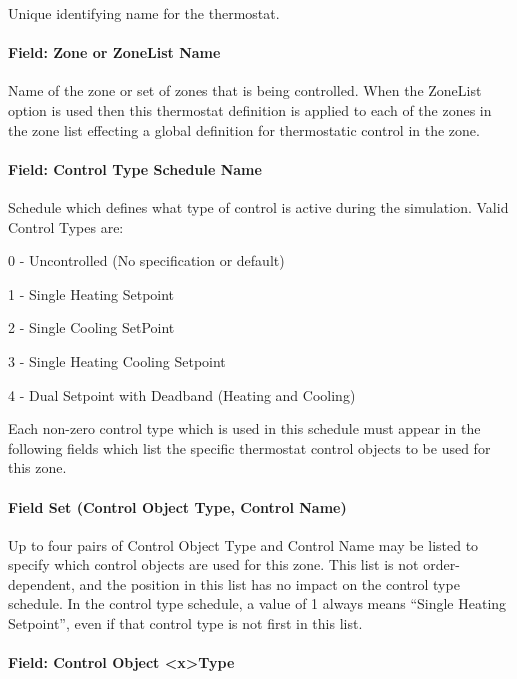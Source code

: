 Unique identifying name for the thermostat.

\paragraph{Field: Zone or ZoneList Name}\label{field-zone-or-zonelist-name-001}

Name of the zone or set of zones that is being controlled. When the ZoneList option is used then this thermostat definition is applied to each of the zones in the zone list effecting a global definition for thermostatic control in the zone.

\paragraph{Field: Control Type Schedule Name}\label{field-control-type-schedule-name}

Schedule which defines what type of control is active during the simulation. Valid Control Types are:

0 - Uncontrolled (No specification or default)

1 - Single Heating Setpoint

2 - Single Cooling SetPoint

3 - Single Heating Cooling Setpoint

4 - Dual Setpoint with Deadband (Heating and Cooling)

Each non-zero control type which is used in this schedule must appear in the following fields which list the specific thermostat control objects to be used for this zone.

\paragraph{Field Set (Control Object Type, Control Name)}\label{field-set-control-object-type-control-name}

Up to four pairs of Control Object Type and Control Name may be listed to specify which control objects are used for this zone. This list is not order-dependent, and the position in this list has no impact on the control type schedule. In the control type schedule, a value of 1 always means ``Single Heating Setpoint'', even if that control type is not first in this list.

\paragraph{Field: Control Object \textless{}x\textgreater{}Type}\label{field-control-object-xtype}

